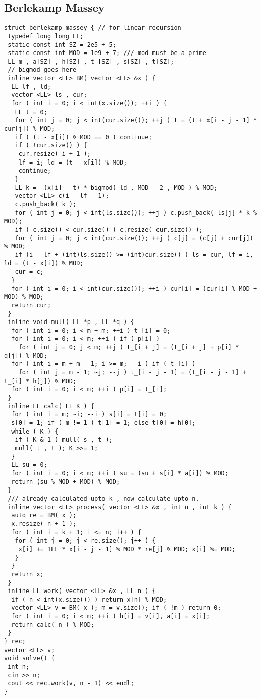 \documentclass[a4paper,11pt,oneside]{article}
\begin{document}
\begin{multicols*}{\COLS}
\subsection{Berlekamp Massey}
\begin{lstlisting}
struct berlekamp_massey { // for linear recursion
 typedef long long LL;
 static const int SZ = 2e5 + 5;
 static const int MOD = 1e9 + 7; /// mod must be a prime
 LL m , a[SZ] , h[SZ] , t_[SZ] , s[SZ] , t[SZ];
 // bigmod goes here
 inline vector <LL> BM( vector <LL> &x ) {
  LL lf , ld;
  vector <LL> ls , cur;
  for ( int i = 0; i < int(x.size()); ++i ) {
   LL t = 0;
   for ( int j = 0; j < int(cur.size()); ++j ) t = (t + x[i - j - 1] * cur[j]) % MOD;
   if ( (t - x[i]) % MOD == 0 ) continue;
   if ( !cur.size() ) {
    cur.resize( i + 1 );
    lf = i; ld = (t - x[i]) % MOD;
    continue;
   }
   LL k = -(x[i] - t) * bigmod( ld , MOD - 2 , MOD ) % MOD;
   vector <LL> c(i - lf - 1);
   c.push_back( k );
   for ( int j = 0; j < int(ls.size()); ++j ) c.push_back(-ls[j] * k % MOD);
   if ( c.size() < cur.size() ) c.resize( cur.size() );
   for ( int j = 0; j < int(cur.size()); ++j ) c[j] = (c[j] + cur[j]) % MOD;
   if (i - lf + (int)ls.size() >= (int)cur.size() ) ls = cur, lf = i, ld = (t - x[i]) % MOD;
   cur = c;
  }
  for ( int i = 0; i < int(cur.size()); ++i ) cur[i] = (cur[i] % MOD + MOD) % MOD;
  return cur;
 }
 inline void mull( LL *p , LL *q ) {
  for ( int i = 0; i < m + m; ++i ) t_[i] = 0;
  for ( int i = 0; i < m; ++i ) if ( p[i] )
    for ( int j = 0; j < m; ++j ) t_[i + j] = (t_[i + j] + p[i] * q[j]) % MOD;
  for ( int i = m + m - 1; i >= m; --i ) if ( t_[i] )
    for ( int j = m - 1; ~j; --j ) t_[i - j - 1] = (t_[i - j - 1] + t_[i] * h[j]) % MOD;
  for ( int i = 0; i < m; ++i ) p[i] = t_[i];
 }
 inline LL calc( LL K ) {
  for ( int i = m; ~i; --i ) s[i] = t[i] = 0;
  s[0] = 1; if ( m != 1 ) t[1] = 1; else t[0] = h[0];
  while ( K ) {
   if ( K & 1 ) mull( s , t );
   mull( t , t ); K >>= 1;
  }
  LL su = 0;
  for ( int i = 0; i < m; ++i ) su = (su + s[i] * a[i]) % MOD;
  return (su % MOD + MOD) % MOD;
 }
 /// already calculated upto k , now calculate upto n.
 inline vector <LL> process( vector <LL> &x , int n , int k ) {
  auto re = BM( x );
  x.resize( n + 1 );
  for ( int i = k + 1; i <= n; i++ ) {
   for ( int j = 0; j < re.size(); j++ ) {
    x[i] += 1LL * x[i - j - 1] % MOD * re[j] % MOD; x[i] %= MOD;
   }
  }
  return x;
 }
 inline LL work( vector <LL> &x , LL n ) {
  if ( n < int(x.size()) ) return x[n] % MOD;
  vector <LL> v = BM( x ); m = v.size(); if ( !m ) return 0;
  for ( int i = 0; i < m; ++i ) h[i] = v[i], a[i] = x[i];
  return calc( n ) % MOD;
 }
} rec;
vector <LL> v;
void solve() {
 int n;
 cin >> n;
 cout << rec.work(v, n - 1) << endl;
}


\end{lstlisting}
\end{multicols*}
\end{document}

